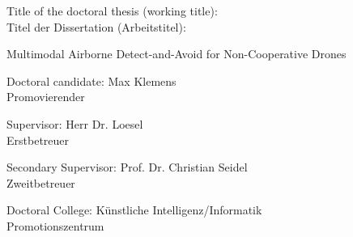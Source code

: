 \hspace*{1.2cm}
\begin{minipage}{0.78\textwidth}

{\hstitlefont\large Title of the doctoral thesis (working title):}\\[-0.2ex]
{\hstitlefont Titel der Dissertation (Arbeitstitel):}

\vspace*{0.7cm}

\begin{center}
{\hsfont\Large
Multimodal Airborne Detect-and-Avoid for Non-Cooperative Drones
}
\end{center}

\vspace*{1.0cm}

{\hstitlefont\large Doctoral candidate:}
{\hsfont\large Max Klemens}\\[-0.2ex]
{\hstitlefont Promovierender}

\vspace*{0.8cm}

{\hstitlefont\large Supervisor:}
{\hsfont\large Herr Dr. Loesel}\\[-0.2ex]
{\hstitlefont Erstbetreuer}

\vspace*{0.8cm}

{\hstitlefont\large Secondary Supervisor:}
{\hsfont\large Prof. Dr. Christian Seidel}\\[-0.2ex]
{\hstitlefont Zweitbetreuer}

\vspace*{0.8cm}

{\hstitlefont\large Doctoral College:}
{\hsfont\large Künstliche Intelligenz/Informatik}\\[-0.2ex]
{\hstitlefont Promotionszentrum}

\end{minipage}

\vfill
\vspace*{0.8cm}

